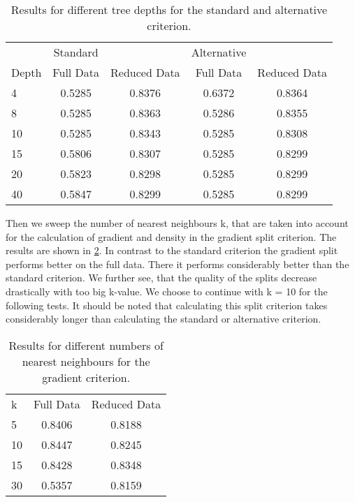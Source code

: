 \documentclass[draft]{article}
\begin{document}
\begin{table}[h]
	\centering
	\begin{tabular}{l c c c c}
				&   Standard  &					& 	Alternative	&				\\
		Depth	&	Full Data & Reduced Data	& 	Full Data	& Reduced Data	\\
		  4		&	0.5285	  &	0.8376			&	0.6372		&	0.8364		\\
		  8 	& 	0.5285	  & 0.8363			&	0.5286		&	0.8355		\\
		  10	&   0.5285	  & 0.8343			&	0.5285		&	0.8308		\\
		  15	& 	0.5806	  & 0.8307			&	0.5285		&	0.8299		\\
		  20	&   0.5823	  & 0.8298			&	0.5285		&	0.8299		\\
		  40	&	0.5847	  & 0.8299			&	0.5285		&	0.8299		\\
	\end{tabular}
	\caption{Results for different tree depths for the standard and alternative criterion.}
	\label{tab3}
\end{table}

Then we sweep the number of nearest neighbours k, that are taken into account for the calculation 
of gradient and density in the gradient split criterion.
\newline
The results are shown in \ref{tab4}. In contrast to the standard criterion the gradient split 
performs better on the full data. There it performs considerably better than the standard criterion.
We further see, that the quality of the splits decrease drastically with too big k-value.
We choose to continue with k = 10 for the following tests.
\newline
It should be noted that calculating this split criterion takes considerably longer than calculating
the standard or alternative criterion.

\begin{table}[h]
	\centering
	\begin{tabular}{l c c}
		  k		&	Full Data & Reduced Data	\\
		  5		&	0.8406	  &	0.8188			\\
	 	  10 	& 	0.8447	  & 0.8245			\\
		  15	&   0.8428	  & 0.8348			\\
		  30	& 	0.5357	  & 0.8159			\\
	\end{tabular}
	\caption{Results for different numbers of nearest neighbours for the gradient criterion.}
	\label{tab4}
\end{table}
\end{document}
